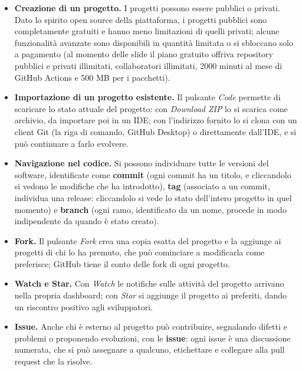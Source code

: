 \begin{itemize}
  \item \textbf{Creazione di un progetto.} I progetti possono essere pubblici o privati. Dato lo spirito open source
        della piattaforma, i progetti pubblici sono completamente gratuiti e hanno meno limitazioni di quelli privati;
        alcune funzionalità avanzate sono disponibili in quantità limitata o si sbloccano solo a pagamento (al momento
        delle slide il piano gratuito offriva repository pubblici e privati illimitati, collaboratori illimitati, 2000
        minuti al mese di GitHub Actions e 500 MB per i pacchetti).
  \item \textbf{Importazione di un progetto esistente.} Il pulsante \textit{Code} permette di scaricare lo stato
        attuale del progetto: con \textit{Download ZIP} lo si scarica come archivio, da importare poi in un IDE;
        con l'indirizzo fornito lo si clona con un client Git (la riga di comando, GitHub Desktop) o direttamente
        dall'IDE, e si può continuare a farlo evolvere.
  \item \textbf{Navigazione nel codice.} Si possono individuare tutte le versioni del software, identificate come
        \textbf{commit} (ogni commit ha un titolo, e cliccandolo si vedono le modifiche che ha introdotto),
        \textbf{tag} (associato a un commit, individua una release: cliccandolo si vede lo stato dell'intero progetto
        in quel momento) e \textbf{branch} (ogni ramo, identificato da un nome, procede in modo indipendente da quando è
        stato creato).
  \item \textbf{Fork.} Il pulsante \textit{Fork} crea una copia esatta del progetto e la aggiunge ai progetti di chi lo
        ha premuto, che può cominciare a modificarla come preferisce; GitHub tiene il conto delle fork di ogni progetto.
  \item \textbf{Watch e Star.} Con \textit{Watch} le notifiche sulle attività del progetto arrivano nella propria
        dashboard; con \textit{Star} si aggiunge il progetto ai preferiti, dando un riscontro positivo agli sviluppatori.
  \item \textbf{Issue.} Anche chi è esterno al progetto può contribuire, segnalando difetti e problemi o proponendo
        evoluzioni, con le \textbf{issue}: ogni issue è una discussione numerata, che si può assegnare a qualcuno,
        etichettare e collegare alla pull request che la risolve.
\end{itemize}


